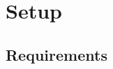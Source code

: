 \documentclass[12pt]{report}	%
\begin{document}


\chapter{Setup}
\section{Requirements}
\end{document}
